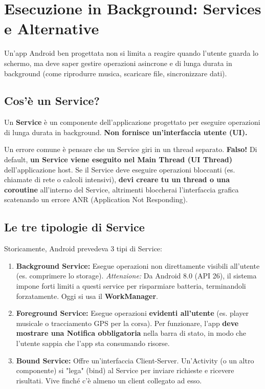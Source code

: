 
\chapter{Esecuzione in Background: Services e Alternative}

Un'app Android ben progettata non si limita a reagire quando l'utente guarda lo schermo, ma deve saper gestire operazioni
asincrone e di lunga durata in background (come riprodurre musica, scaricare file, sincronizzare dati).

\section{Cos'è un Service?}
Un \textbf{Service} è un componente dell'applicazione progettato per eseguire operazioni di lunga durata in background.
\textbf{Non fornisce un'interfaccia utente (UI).}

\begin{tcolorbox}[colback=red!5!white,colframe=red!75!black,title=TRABOCCHETTO DA ESAME: Service vs Thread]
    Un errore comune è pensare che un Service giri in un thread separato. \textbf{Falso!}
    Di default, \textbf{un Service viene eseguito nel Main Thread (UI Thread)} dell'applicazione host.
    Se il Service deve eseguire operazioni bloccanti (es.
    chiamate di rete o calcoli intensivi), \textbf{devi creare tu un thread o una coroutine} all'interno del Service,
    altrimenti bloccherai l'interfaccia grafica scatenando un errore ANR (Application Not Responding).
\end{tcolorbox}

\section{Le tre tipologie di Service}
Storicamente, Android prevedeva 3 tipi di Service:
\begin{enumerate}
    \item \textbf{Background Service:} Esegue operazioni non direttamente visibili all'utente (es.
    comprimere lo storage). \textit{Attenzione:} Da Android 8.0 (API 26), il sistema impone forti limiti a questi service per risparmiare batteria, terminandoli forzatamente.
    Oggi si usa il \textbf{WorkManager}.
    \item \textbf{Foreground Service:} Esegue operazioni \textbf{evidenti all'utente} (es. player musicale o tracciamento GPS per la corsa).
    Per funzionare, l'app \textbf{deve mostrare una Notifica obbligatoria} nella barra di stato, in modo che l'utente sappia che l'app sta consumando risorse.
    \item \textbf{Bound Service:} Offre un'interfaccia Client-Server.
    Un'Activity (o un altro componente) si "lega" (bind) al Service per inviare richieste e ricevere risultati.
    Vive finché c'è almeno un client collegato ad esso.
\end{enumerate}

